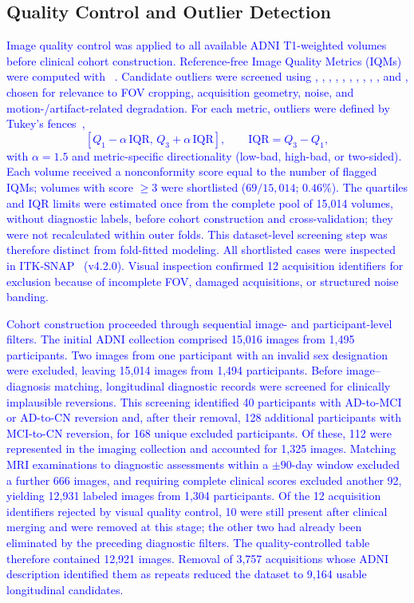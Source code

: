 \documentclass[review]{elsarticle}
\newcommand{\code}[1]{\texttt{\seqsplit{#1}}}
\newcommand{\corrigir}[2]{%
	\textcolor{red}{\sout{#1}} %
	\textcolor{blue}{#2}%
}
\begin{document}
	\subsection{Quality Control and Outlier Detection}
	
	\corrigir{}{Image quality control was applied to all available ADNI T1-weighted volumes before clinical cohort construction. Reference-free Image Quality Metrics (IQMs) were computed with \code{MRQy}~\citep{sadri-2020}. Candidate outliers were screened using 	\code{VRX}, \code{COL}, \code{NUM}, \code{CPP}, \code{PSNR}, \code{SNR7}, \code{CNR}, \code{CVP}, \code{CJV}, \code{EFC}, and \code{FBER}, chosen for relevance to FOV cropping, acquisition geometry, noise, and motion-/artifact-related degradation. For each metric, outliers were defined by Tukey's fences~\citep{tukey-1977},
		\begin{equation}
			\left[Q_1 - \alpha\,\mathrm{IQR},\, Q_3 + \alpha\,\mathrm{IQR}\right],
			\qquad \mathrm{IQR} = Q_3 - Q_1,
			\label{eq:tukey}
		\end{equation}
		with $\alpha = 1.5$ and metric-specific directionality (low-bad, high-bad, or two-sided). 	Each volume received a nonconformity score equal to the number of flagged IQMs; volumes with score $\geq 3$ were shortlisted ($69/15{,}014$; $0.46\%$). The quartiles and IQR limits were estimated once from the complete pool of 15,014 volumes, without diagnostic labels, before cohort construction and cross-validation; they were not recalculated within outer folds. This dataset-level screening step was therefore distinct from fold-fitted modeling. All shortlisted cases were inspected in ITK-SNAP~\citep{yushkevich-2006} (v4.2.0). Visual inspection confirmed 12 acquisition identifiers for exclusion because of incomplete FOV, damaged acquisitions, or structured noise banding.}
	
	\corrigir{}{Cohort construction proceeded through sequential image- and participant-level filters. The initial ADNI collection comprised 15,016 images from 1,495 participants. Two images from one participant with an invalid sex designation were excluded, leaving 15,014 images from 1,494 participants. Before image--diagnosis matching, longitudinal diagnostic records were screened for clinically implausible reversions. This screening identified 40 participants with AD-to-MCI or AD-to-CN reversion and, after their removal, 128 additional participants with MCI-to-CN reversion, for 168 unique excluded participants. Of these, 112 were represented in the imaging collection and accounted for 1,325 images. Matching MRI examinations to diagnostic assessments within a $\pm90$-day window excluded a further 666 images, and requiring complete clinical scores excluded another 92, yielding 12,931 labeled images from 1,304 participants.
		Of the 12 acquisition identifiers rejected by visual quality control, 10 were still present after clinical merging and were removed at this stage; the other two had already been eliminated by the preceding diagnostic filters. The quality-controlled table therefore contained 12,921 images. Removal of 3,757 acquisitions whose ADNI description identified them as repeats reduced the dataset to 9,164 usable longitudinal candidates.}
	
\end{document}

